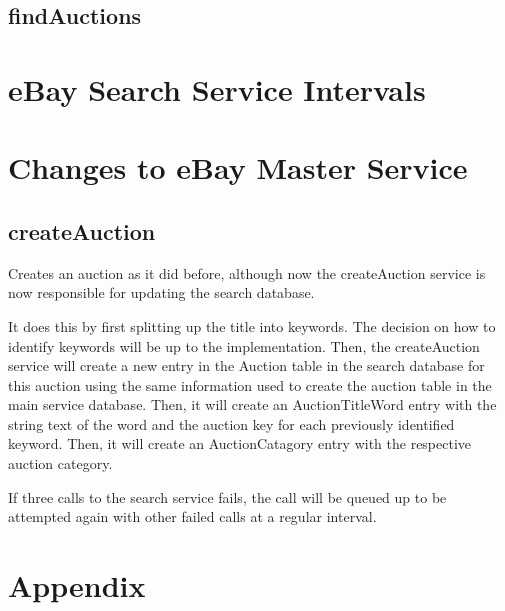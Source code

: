 \documentclass[12pt,a4paper]{article}
\begin{document}
\subsection{findAuctions}



\section{eBay Search Service Intervals}

\section{Changes to eBay Master Service}

\subsection{createAuction}

Creates an auction as it did before, although now the createAuction service is
now responsible for updating the search database.

It does this by first splitting up the title into keywords. The decision on how
to identify keywords will be up to the implementation. Then, the createAuction
service will create a new entry in the Auction table in the search database for
this auction using the same information used to create the auction table in the
main service database. Then, it will create an AuctionTitleWord entry with the
string text of the word and the auction key for each previously identified
keyword. Then, it will create an AuctionCatagory entry with the respective
auction category.

If three calls to the search service fails, the call will be queued up to be
attempted again with other failed calls at a regular interval.


\section{Appendix}
\end{document}

